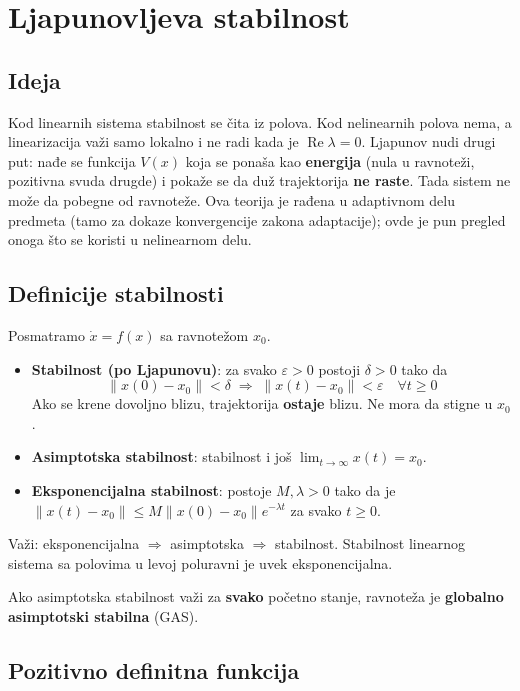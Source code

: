 \documentclass[11pt,a4paper,parskip=half,headsepline,numbers=noenddot]{scrartcl}
\begin{document}
\section{Ljapunovljeva stabilnost}

\subsection{Ideja}

Kod linearnih sistema stabilnost se čita iz polova. Kod nelinearnih polova nema, a linearizacija važi samo lokalno i ne radi kada je \(\operatorname{Re}\lambda = 0\). Ljapunov nudi drugi put: nađe se funkcija \(V(x)\) koja se ponaša kao \textbf{energija} (nula u ravnoteži, pozitivna svuda drugde) i pokaže se da duž trajektorija \textbf{ne raste}. Tada sistem ne može da pobegne od ravnoteže. Ova teorija je rađena u adaptivnom delu predmeta (tamo za dokaze konvergencije zakona adaptacije); ovde je pun pregled onoga što se koristi u nelinearnom delu.

\subsection{Definicije stabilnosti}

Posmatramo \(\dot x = f(x)\) sa ravnotežom \(x_0\).

\begin{itemize}
\item \textbf{Stabilnost (po Ljapunovu)}: za svako \(\varepsilon > 0\) postoji \(\delta > 0\) tako da
  \[\|x(0) - x_0\| < \delta \;\Rightarrow\; \|x(t) - x_0\| < \varepsilon \quad \forall t \ge 0\]
  Ako se krene dovoljno blizu, trajektorija \textbf{ostaje} blizu. Ne mora da stigne u \(x_0\).
\item \textbf{Asimptotska stabilnost}: stabilnost i još \(\lim_{t\to\infty} x(t) = x_0\).
\item \textbf{Eksponencijalna stabilnost}: postoje \(M, \lambda > 0\) tako da je \(\|x(t) - x_0\| \le M\|x(0) - x_0\|e^{-\lambda t}\) za svako \(t \ge 0\).
\end{itemize}

Važi: eksponencijalna \(\Rightarrow\) asimptotska \(\Rightarrow\) stabilnost. Stabilnost linearnog sistema sa polovima u levoj poluravni je uvek eksponencijalna.

Ako asimptotska stabilnost važi za \textbf{svako} početno stanje, ravnoteža je \textbf{globalno asimptotski stabilna} (GAS).

\subsection{Pozitivno definitna funkcija}
\end{document}

